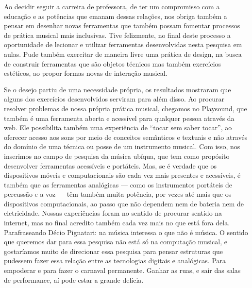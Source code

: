 

Ao decidir seguir a carreira de professora, de ter um compromisso com a educação e as potências que emanam dessas relações, nos obriga também a pensar em desenhar novas ferramentas que também possam fomentar processos de prática musical mais inclusivas. Tive felizmente, no final deste processo a oportunidade de lecionar e utilizar ferramentas desenvolvidas nesta pesquisa em aulas. Pude também exercitar de maneira livre uma prática de design, na busca de construir ferramentas que são objetos técnicos mas também exercícios estéticos, ao propor formas novas de interação musical. 


Se o desejo partiu de uma necessidade própria, os resultados mostraram que alguns dos exercícios desenvolvidos serviram para além disso. Ao procurar resolver problemas de nossa própria prática musical, chegamos no Playsound, que também é uma ferramenta aberta e acessível para qualquer pessoa através da web.  Ele possibilita também uma experiência de ``tocar sem saber tocar'', ao oferecer acesso aos sons por meio de conceitos semânticos e textuais e não através do domínio de uma técnica ou posse de um instrumento musical. Com isso, nos inserimos no campo de pesquisa da música ubíqua, que tem como propósito desenvolver ferramentas acessíveis e portáteis. Mas, se é verdade que os dispositivos móveis e computacionais são cada vez mais presentes e acessíveis, é também que as ferramentas analógicas --- como os instrumentos portáteis de percussão e a voz --- têm também muita potência, por vezes até mais que os dispositivos computacionais, ao passo que não dependem nem de bateria nem de eletricidade. Nossas experiências foram no sentido de procurar sentido na internet, mas no final acredito também cada vez mais no que está fora dela. Parafraseando Décio Pignatari: na música interessa o que não é música. O sentido que queremos dar para essa pesquisa não está só na computação musical, e gostaríamos muito de direcionar essa pesquisa para pensar estruturas que pudessem fazer essa relação entre as tecnologias digitais e analógicas. Para empoderar e para fazer o carnaval permanente. Ganhar as ruas, e sair das salas de performance, aí pode estar a grande delícia.






